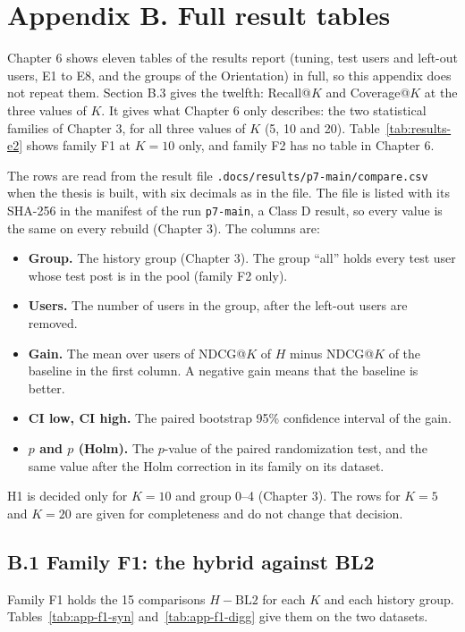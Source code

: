 \section*{Appendix B. Full result tables}

Chapter 6 shows eleven tables of the results report (tuning, test users and left-out users, E1 to E8, and the groups of the Orientation) in full, so this appendix does not repeat them. Section B.3 gives the twelfth: Recall@$K$ and Coverage@$K$ at the three values of $K$. It gives what Chapter 6 only describes: the two statistical families of Chapter 3, for all three values of $K$ (5, 10 and 20). Table~\ref{tab:results-e2} shows family F1 at $K = 10$ only, and family F2 has no table in Chapter 6.

The rows are read from the result file \texttt{.docs/results/p7-main/compare.csv} when the thesis is built, with six decimals as in the file. The file is listed with its SHA-256 in the manifest of the run \texttt{p7-main}, a Class D result, so every value is the same on every rebuild (Chapter 3). The columns are:
\begin{itemize}
  \item \textbf{Group.} The history group (Chapter 3). The group ``all'' holds every test user whose test post is in the pool (family F2 only).
  \item \textbf{Users.} The number of users in the group, after the left-out users are removed.
  \item \textbf{Gain.} The mean over users of NDCG@$K$ of $H$ minus NDCG@$K$ of the baseline in the first column. A negative gain means that the baseline is better.
  \item \textbf{CI low, CI high.} The paired bootstrap 95\% confidence interval of the gain.
  \item \textbf{$p$ and $p$ (Holm).} The $p$-value of the paired randomization test, and the same value after the Holm correction in its family on its dataset.
\end{itemize}
H1 is decided only for $K = 10$ and group 0--4 (Chapter 3). The rows for $K = 5$ and $K = 20$ are given for completeness and do not change that decision.

\subsection*{B.1 Family F1: the hybrid against BL2}

Family F1 holds the 15 comparisons $H - \text{BL2}$ for each $K$ and each history group. Tables~\ref{tab:app-f1-syn} and~\ref{tab:app-f1-digg} give them on the two datasets.


